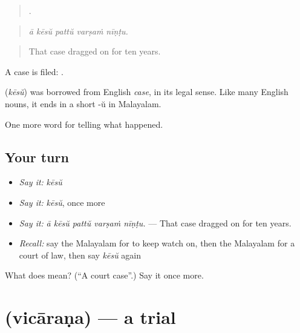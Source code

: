 \begin{quote}
    .
\end{quote}

\begin{quote}
\emph{ā kēsŭ pattŭ varṣaṁ nīṇṭu.}
\end{quote}

\begin{quote}
That case dragged on for ten years.
\end{quote}

A case is filed:  .

\begin{cousinweb}
\textbf{} (\emph{kēsŭ}) was borrowed from English \emph{case}, in its legal sense. Like many English nouns, it ends in a short -ŭ in Malayalam.
\end{cousinweb}

\begin{grammarlens}[title={What you've built}]
One more word for telling what happened.
\end{grammarlens}

\subsection*{Your turn}
\begin{itemize}
\raggedright
  \item \emph{Say it:} \emph{kēsŭ}
  \item \emph{Say it:} \emph{kēsŭ}, once more
  \item \emph{Say it:} \emph{ā kēsŭ pattŭ varṣaṁ nīṇṭu.} — That case dragged on for ten years.
  \item \emph{Recall:} say the Malayalam for to keep watch on, then the Malayalam for a court of law, then say \emph{kēsŭ} again
\end{itemize}

\begin{tcolorbox}[breakable,colback=teal!4,colframe=teal!35!black,title={Before you move on}]
What does  mean? (\textquotedblleft{}A court case\textquotedblright{}.) Say it once more.
\end{tcolorbox}
\section[\texorpdfstring{\ml{വിചാരണ} (vicāraṇa)}{വിചാരണ (vicāraṇa)}]{ (vicāraṇa) — a trial}

\label{lesson:ML-C368-vicarana}



